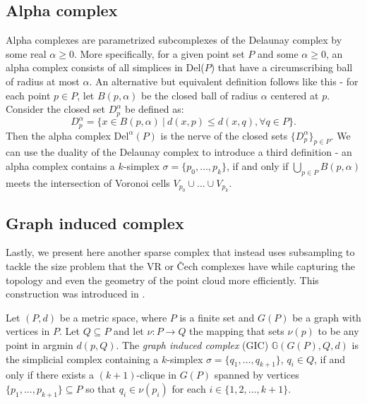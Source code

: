 \subsection{Alpha complex}
Alpha complexes are parametrized subcomplexes of the Delaunay complex by some real $\alpha \geq 0$. More specifically, for a given point set $P$ and some $\alpha \geq 0$, an alpha complex consists of all simplices in Del($P$) that have a circumscribing ball of radius at most $\alpha$. An alternative but equivalent definition follows like this - for each point $p \in P$, let $B(p,\alpha)$ be the closed ball of radius $\alpha$ centered at $p$. Consider the closed set $D^{\alpha}_{p}$ be defined as:
\begin{equation*}
  D^{\alpha}_{p} = \{x \in B(p,\alpha) \: \vert \: d(x,p) \leq d(x,q), \forall q \in P\}.
\end{equation*}
Then the alpha complex $\text{Del}^{\alpha}(P)$ is the nerve of the closed sets $\{D^{\alpha}_{p}\}_{p \in P}$.
We can use the duality of the Delaunay complex to introduce a third definition - an alpha complex contains a $k$-simplex $\sigma = \{p_{0}, \ldots, p_{k}\}$, if and only if $\bigcup_{p \in P}B(p,\alpha)$ meets the intersection of Voronoi cells $V_{p_{0}} \cup \ldots \cup V_{p_{k}}$.

\subsection{Graph induced complex}
Lastly, we present here another sparse complex that instead uses subsampling to tackle the size problem that the VR or Čech complexes have while capturing the topology and even the geometry of the point cloud more efficiently. This construction was introduced in \cite{dey2013graphinducedcomplexpoint}.

\begin{definition}
  Let $(P,d)$ be a metric space, where $P$ is a finite set and $G(P)$ be a graph with vertices in $P$. Let $Q \subseteq P$ and let $\nu : P \to Q$ the mapping that sets $\nu(p)$ to be any point in argmin $d(p,Q)$. The \textit{graph induced complex} (GIC) $\mathbb{G}(G(P),Q,d)$ is the simplicial complex containing a $k$-simplex $\sigma=\{q_{1}, \ldots, q_{k+1}\}$, $q_{i} \in Q$, if and only if there exists a $(k+1)$-clique in $G(P)$ spanned by vertices $\{p_{1}, \ldots, p_{k+1}\} \subseteq P$ so that $q_{i} \in \nu(p_{i})$ for each $i \in \{1,2, \ldots, k+1\}$.
\end{definition}

